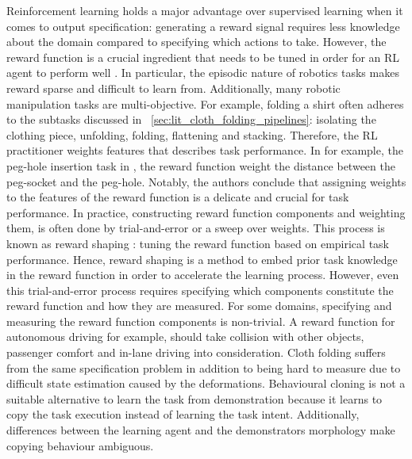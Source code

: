 \documentclass[\home/main.tex]{subfiles}
\begin{document}
Reinforcement learning holds a major advantage over supervised learning when it comes to output specification: generating a reward signal requires less knowledge about the domain compared to specifying which actions to take. However, the reward function is a crucial ingredient that needs to be tuned in order for an RL agent to perform well \autocite{Sutton2018}. In particular, the episodic nature of robotics tasks makes reward sparse and difficult to learn from. Additionally, many robotic manipulation tasks are multi-objective. For example, folding a shirt often adheres to the subtasks discussed in ~\cref{sec:lit_cloth_folding_pipelines}: isolating the clothing piece, unfolding, folding, flattening and stacking. Therefore, the RL practitioner weights features that describes task performance. In for example, the peg-hole insertion task in \autocite{vecerik2018leveraging}, the reward function weight the distance between the peg-socket and the peg-hole. Notably, the authors conclude that assigning weights to the features of the reward function is a delicate and crucial for task performance. In practice, constructing reward function components and weighting them, is often done by trial-and-error or a sweep over weights.
This process is known as reward shaping \autocite{laud2004theory}: tuning the reward function based on empirical task performance. Hence, reward shaping is a method to embed prior task knowledge in the reward function in order to accelerate the learning process. However, even this trial-and-error process requires specifying which components constitute the reward function and how they are measured. For some domains, specifying and measuring the reward function components is non-trivial. A reward function for autonomous driving for example, should take collision with other objects, passenger comfort and in-lane driving into consideration. Cloth folding suffers from the same specification problem in addition to being hard to measure due to difficult state estimation caused by the deformations. Behavioural cloning is not a suitable alternative to learn the task from demonstration because it learns to copy the task execution instead of learning the task intent. Additionally, differences between the learning agent and the demonstrators morphology make copying behaviour ambiguous. 
\end{document}
